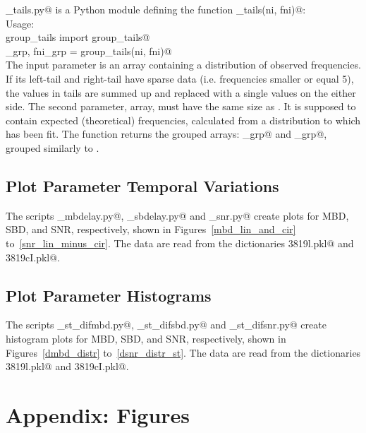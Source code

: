 \documentclass[letterpaper,twoside,12pt]{article}
\begin{document}
\verb@group_tails.py@ is a Python module defining the function \verb@group_tails(ni, fni)@: \\

Usage: \\
\verb@from group_tails import group_tails@ \\
\verb@ni_grp, fni_grp = group_tails(ni, fni)@ \\

The input parameter \verb@ni@ is an array containing a distribution of observed frequencies. If its left-tail and right-tail have sparse data (i.e. frequencies smaller or equal 5), the values in tails are summed up and replaced with a single values on the either side. The second parameter, \verb@fni@ array, must have the same size as \verb@ni@. It is supposed to contain expected (theoretical) frequencies, calculated from a distribution to which \verb@ni@ has been fit. The function returns the grouped arrays: \verb@ni_grp@ and \verb@fni_grp@, grouped similarly to \verb@ni@.

\subsection{Plot Parameter Temporal Variations}

The scripts \verb@plot_mbdelay.py@, \verb@plot_sbdelay.py@ and \verb@plot_snr.py@ create plots for MBD, SBD, and SNR, respectively, shown in Figures~\ref{mbd_lin_and_cir} to~\ref{snr_lin_minus_cir}.  The data are read from the dictionaries \verb@idx3819l.pkl@ and \verb@idx3819cI.pkl@.

\subsection{Plot Parameter Histograms}

The scripts \verb@plot_st_difmbd.py@, \verb@plot_st_difsbd.py@ and \verb@plot_st_difsnr.py@ create histogram plots for MBD, SBD, and SNR, respectively, shown in Figures~\ref{dmbd_distr} to~\ref{dsnr_distr_st}.  The data are read from the dictionaries \verb@idx3819l.pkl@ and \verb@idx3819cI.pkl@.


\section{Appendix: Figures}
\end{document}
